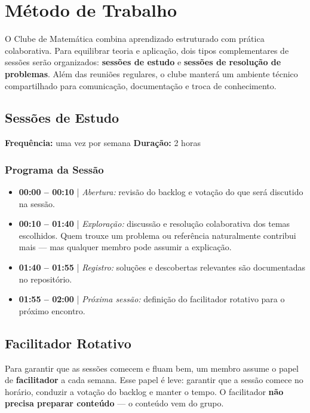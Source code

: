 \clearpage

\section{Método de Trabalho}

O Clube de Matemática combina aprendizado estruturado com prática colaborativa. Para
equilibrar teoria e aplicação, dois tipos complementares de sessões serão organizados:
\textbf{sessões de estudo} e \textbf{sessões de resolução de problemas}. Além das reuniões
regulares, o clube manterá um ambiente técnico compartilhado para comunicação, documentação
e troca de conhecimento.

\subsection{Sessões de Estudo}

\begin{infobox}
  \textbf{Frequência:} uma vez por semana \quad\textbf{Duração:} 2 horas
\end{infobox}

\subsubsection{Programa da Sessão}

\begin{itemize}
  \item \textbf{00:00 -- 00:10} | \textit{Abertura:} revisão do backlog e votação do que
    será discutido na sessão.
  \item \textbf{00:10 -- 01:40} | \textit{Exploração:} discussão e resolução colaborativa
    dos temas escolhidos. Quem trouxe um problema ou referência naturalmente contribui mais
    --- mas qualquer membro pode assumir a explicação.
  \item \textbf{01:40 -- 01:55} | \textit{Registro:} soluções e descobertas relevantes são
    documentadas no repositório.
  \item \textbf{01:55 -- 02:00} | \textit{Próxima sessão:} definição do facilitador
    rotativo para o próximo encontro.
\end{itemize}

\subsection{Facilitador Rotativo}

Para garantir que as sessões comecem e fluam bem, um membro assume o papel de
\textbf{facilitador} a cada semana. Esse papel é leve: garantir que a sessão comece no
horário, conduzir a votação do backlog e manter o tempo. O facilitador \textbf{não precisa
preparar conteúdo} --- o conteúdo vem do grupo.

